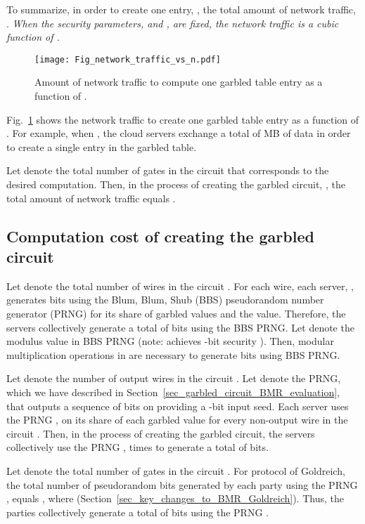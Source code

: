 \documentclass[10pt,journal,cspaper,compsoc]{IEEEtran}
\begin{document}
To summarize, in order to create one entry, , the total amount of network traffic, . {\em When the security parameters,  and , are fixed, the network traffic is a cubic function of .}

\begin{figure}[t]
\centering
\texttt{[image: Fig\_network\_traffic\_vs\_n.pdf]}
\vspace{-3 mm}
\caption{Amount of network traffic to compute one garbled table entry as a function of .\vspace{-4 mm}}
\label{fig_network_traffic}
\end{figure}

Fig.~\ref{fig_network_traffic} shows the network traffic to create one garbled table entry as a function of . For example, when , the cloud servers exchange a total of  MB of data in order to create a single entry in the garbled table.


Let  denote the total number of gates in the circuit  that corresponds to the desired computation. Then, in the process of creating the garbled circuit, , the total amount of network traffic equals .


\subsection{Computation cost of creating the garbled circuit}

Let  denote the total number of wires in the circuit . For each wire, each server, , generates  bits using the Blum, Blum, Shub (BBS) pseudorandom number generator (PRNG) for its share of garbled values and the  value. Therefore, the  servers collectively generate a total of  bits using the BBS PRNG. Let  denote the modulus value in BBS PRNG (note:  achieves -bit security \cite{nist_key_len_recommendations2012}). Then,  modular multiplication operations in  are necessary to generate bits using BBS PRNG.


Let  denote the number of output wires in the circuit . Let  denote the PRNG, which we have described in Section~\ref{sec_garbled_circuit_BMR_evaluation}, that outputs a sequence of  bits on providing a -bit input seed. Each server uses the PRNG , on its share of each garbled value for every non-output wire in the circuit . Then, in the process of creating the garbled circuit, the  servers collectively use the PRNG ,  times to generate a total of  bits.


Let  denote the total number of gates in the circuit . For protocol of Goldreich, the total number of pseudorandom bits generated by each party using the PRNG , equals , where  (Section~\ref{sec_key_changes_to_BMR_Goldreich}). Thus, the  parties collectively generate a total of  bits using the PRNG .
\end{document}
